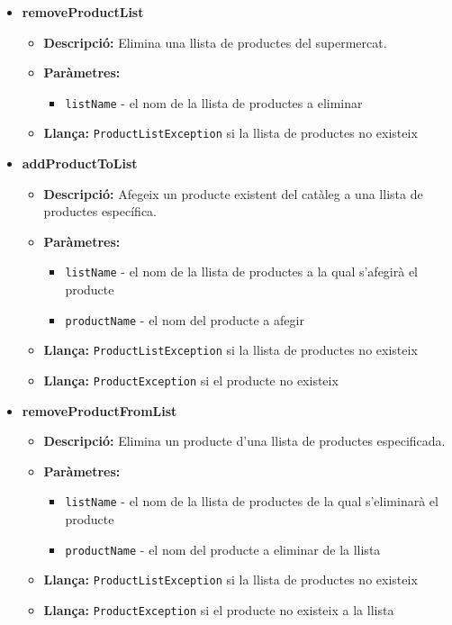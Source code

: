 \documentclass[a4paper, t]{article}
\begin{document}
\begin{itemize}
    \item \textbf{removeProductList}
    \begin{itemize}
        \item \textbf{Descripció:} Elimina una llista de productes del supermercat.
        \item \textbf{Paràmetres:}
        \begin{itemize}
            \item \texttt{listName} - el nom de la llista de productes a eliminar
        \end{itemize}
        \item \textbf{Llança:} \texttt{ProductListException} si la llista de productes no existeix
    \end{itemize}

    \item \textbf{addProductToList}
    \begin{itemize}
        \item \textbf{Descripció:} Afegeix un producte existent del catàleg a una llista de productes específica.
        \item \textbf{Paràmetres:}
        \begin{itemize}
            \item \texttt{listName} - el nom de la llista de productes a la qual s'afegirà el producte
            \item \texttt{productName} - el nom del producte a afegir
        \end{itemize}
        \item \textbf{Llança:} \texttt{ProductListException} si la llista de productes no existeix
        \item \textbf{Llança:} \texttt{ProductException} si el producte no existeix
    \end{itemize}

    \item \textbf{removeProductFromList}
    \begin{itemize}
        \item \textbf{Descripció:} Elimina un producte d'una llista de productes especificada.
        \item \textbf{Paràmetres:}
        \begin{itemize}
            \item \texttt{listName} - el nom de la llista de productes de la qual s'eliminarà el producte
            \item \texttt{productName} - el nom del producte a eliminar de la llista
        \end{itemize}
        \item \textbf{Llança:} \texttt{ProductListException} si la llista de productes no existeix
        \item \textbf{Llança:} \texttt{ProductException} si el producte no existeix a la llista
    \end{itemize}


\end{itemize}
\end{document}

